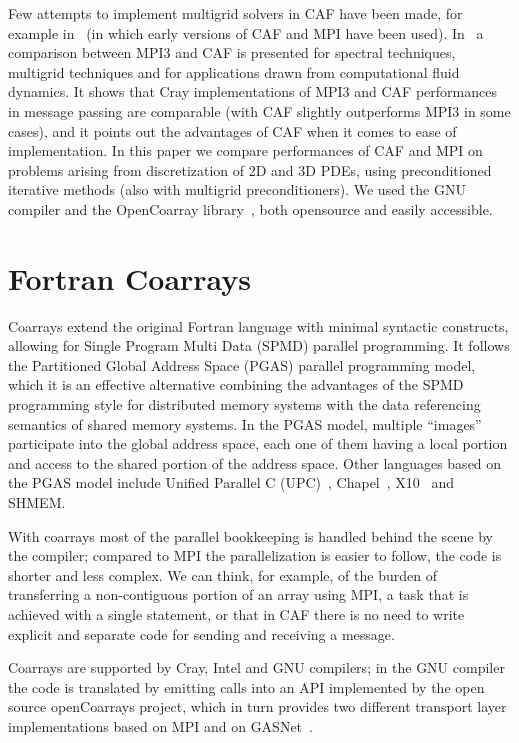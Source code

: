 \documentclass{IOS-Book-Article}
\begin{document}
Few attempts to implement multigrid solvers in CAF have been made, for
example in~\cite{Numrich:1998} (in which early versions of CAF and MPI
have been used).  In~\cite{Garain:2015} a comparison between MPI3 and
CAF is presented for spectral techniques, multigrid techniques and for
applications drawn from computational fluid dynamics. It shows that
Cray implementations of MPI3 and CAF performances in message passing
are comparable (with CAF slightly outperforms MPI3 in some cases), and
it points out the advantages of CAF when it comes to ease of
implementation. In this paper we compare performances of CAF and MPI
on problems arising from discretization of 2D and 3D PDEs, using
preconditioned iterative methods (also with multigrid
preconditioners). We used the GNU compiler and the OpenCoarray
library~\cite{PGAS14}, both opensource and easily accessible.

\section{Fortran Coarrays}

Coarrays extend the original Fortran language with minimal syntactic 
constructs, allowing for Single Program Multi Data (SPMD) parallel
programming.  
It follows the Partitioned Global Address Space (PGAS) parallel
programming model, which it is an effective alternative combining the
advantages of the SPMD programming style for distributed memory
systems with the data referencing semantics of shared memory systems.  
In the PGAS model, multiple ``images'' participate into  the global
address space, each one of them having a local portion and access to
the shared portion of the address space. 
Other  languages based on the PGAS model include Unified Parallel C
(UPC)~\cite{UPCSpec},  Chapel~\cite{chapel}, X10~\cite{Charles:2005}
and SHMEM.

With coarrays most of the parallel bookkeeping is handled behind the scene by
the compiler;  compared to MPI the parallelization is easier to
follow, the code is shorter and less complex. We can think, for
example, of the burden of transferring a non-contiguous portion of an
array using MPI, a task that is achieved with a single statement, 
or  that in  CAF there is no need to write explicit and separate code
for sending and receiving a message. 

Coarrays are supported by Cray, Intel and  GNU 
compilers; in the GNU compiler the code is translated by emitting
calls into an API  implemented by the open source openCoarrays
project, which in turn provides two different transport
layer implementations  based on MPI and on GASNet~\cite{PGAS14}.  
\end{document}
